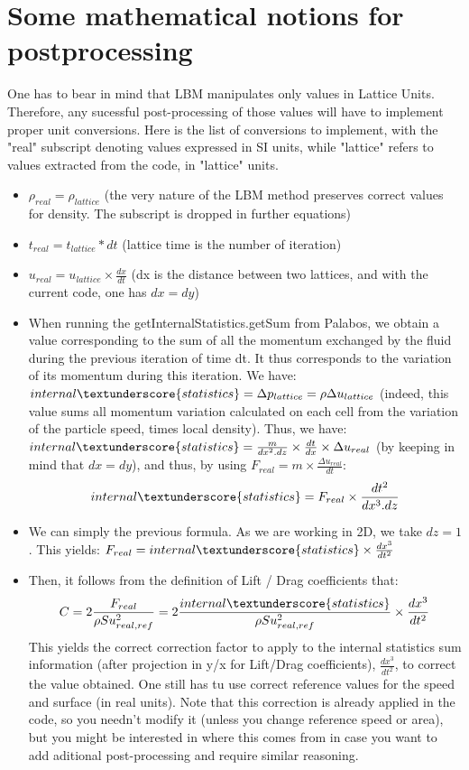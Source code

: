 \documentclass{article}
\begin{document}
\section{Some mathematical notions for postprocessing}

One has to bear in mind that LBM manipulates only values in Lattice Units. Therefore, any sucessful post-processing of those values will have to implement proper unit conversions.
Here is the list of conversions to implement, with the "real" subscript denoting values expressed in SI units, while "lattice" refers to values extracted from the code, in "lattice" units.

\begin{itemize}
    \item $\rho_{real} = \rho_{lattice}$ (the very nature of the LBM method preserves correct values for density. The subscript is dropped in further equations) 
    \item $t_{real} = t_{lattice}*dt$ (lattice time is the number of iteration)
    \item $u_{real} = u_{lattice} \times \frac{dx}{dt}$ (dx is the distance between two lattices, and with the current code, one has $dx=dy$)
    \item When running the getInternalStatistics.getSum from Palabos, we obtain a value corresponding to the sum of all the momentum exchanged by the fluid during the previous iteration of time dt. It thus corresponds to the variation of its momentum during this iteration. We have: $internal\textunderscore{statistics} = \Delta p_{lattice} = \rho \Delta u_{lattice}$ (indeed, this value sums all momentum variation calculated on each cell from the variation of the particle speed, times local density). Thus, we have: $internal\textunderscore{statistics} = \frac{m}{dx^2.dz} \times \frac{dt}{dx} \times \Delta u_{real}$ (by keeping in mind that $dx=dy$), and thus, by using $F_{real} = m\times \frac{\Delta u_{real}}{dt}$: $$internal\textunderscore{statistics} = F_{real} \times \frac{dt^2}{dx^3.dz}$$
    \item We can simply the previous formula. As we are working in 2D, we take $dz=1$. This yields: $F_{real} =internal\textunderscore{statistics} \times \frac{dx^3}{dt^2}$
    \item Then, it follows from the definition of Lift / Drag coefficients that: $$C = 2\frac{F_{real}}{\rho S u_{real, ref}^2} = 2\frac{internal\textunderscore{statistics}}{\rho S u_{real, ref}^2}\times \frac{dx^3}{dt^2}$$ This yields the correct correction factor to apply to the internal statistics sum information (after projection in y/x for Lift/Drag coefficients), $\frac{dx^3}{dt^2}$, to correct the value obtained. One still has tu use correct reference values for the speed and surface (in real units). Note that this correction is already applied in the code, so you needn't modify it (unless you change reference speed or area), but you might be interested in where this comes from in case you want to add aditional post-processing and require similar reasoning.
\end{itemize}
\end{document}
